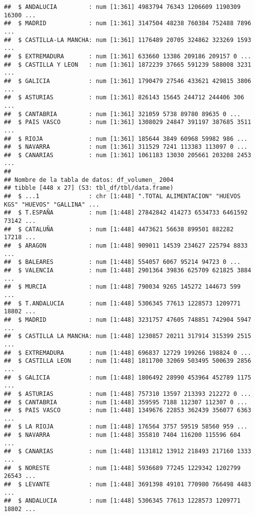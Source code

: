 \documentclass[
]{article}
\begin{document}
\begin{verbatim}
##  $ ANDALUCIA         : num [1:361] 4983794 76343 1206609 1190309 16300 ...
##  $ MADRID            : num [1:361] 3147504 48238 760384 752488 7896 ...
##  $ CASTILLA-LA MANCHA: num [1:361] 1176489 20705 324862 323269 1593 ...
##  $ EXTREMADURA       : num [1:361] 633660 13386 209186 209157 0 ...
##  $ CASTILLA Y LEON   : num [1:361] 1872239 37665 591239 588008 3231 ...
##  $ GALICIA           : num [1:361] 1790479 27546 433621 429815 3806 ...
##  $ ASTURIAS          : num [1:361] 826143 15645 244712 244406 306 ...
##  $ CANTABRIA         : num [1:361] 321059 5738 89780 89635 0 ...
##  $ PAIS VASCO        : num [1:361] 1308029 24847 391197 387685 3511 ...
##  $ RIOJA             : num [1:361] 185644 3849 60968 59982 986 ...
##  $ NAVARRA           : num [1:361] 311529 7241 113383 113097 0 ...
##  $ CANARIAS          : num [1:361] 1061183 13030 205661 203208 2453 ...
##  
## Nombre de la tabla de datos: df_volumen_ 2004 
## tibble [448 x 27] (S3: tbl_df/tbl/data.frame)
##  $ ...1              : chr [1:448] ".TOTAL ALIMENTACION" "HUEVOS KGS" "HUEVOS" "GALLINA" ...
##  $ T.ESPAÑA          : num [1:448] 27842842 414273 6534733 6461592 73142 ...
##  $ CATALUÑA          : num [1:448] 4473621 56638 899501 882282 17218 ...
##  $ ARAGON            : num [1:448] 909011 14539 234627 225794 8833 ...
##  $ BALEARES          : num [1:448] 554057 6067 95214 94723 0 ...
##  $ VALENCIA          : num [1:448] 2901364 39836 625709 621825 3884 ...
##  $ MURCIA            : num [1:448] 790034 9265 145272 144673 599 ...
##  $ T.ANDALUCIA       : num [1:448] 5306345 77613 1228573 1209771 18802 ...
##  $ MADRID            : num [1:448] 3231757 47605 748851 742904 5947 ...
##  $ CASTILLA LA MANCHA: num [1:448] 1230857 20211 317914 315399 2515 ...
##  $ EXTREMADURA       : num [1:448] 696837 12729 199266 198824 0 ...
##  $ CASTILLA LEON     : num [1:448] 1811700 32069 503495 500639 2856 ...
##  $ GALICIA           : num [1:448] 1806492 28990 453964 452789 1175 ...
##  $ ASTURIAS          : num [1:448] 757310 13597 213393 212272 0 ...
##  $ CANTABRIA         : num [1:448] 359595 7188 112307 112307 0 ...
##  $ PAIS VASCO        : num [1:448] 1349676 22853 362439 356077 6363 ...
##  $ LA RIOJA          : num [1:448] 176564 3757 59519 58560 959 ...
##  $ NAVARRA           : num [1:448] 355810 7404 116200 115596 604 ...
##  $ CANARIAS          : num [1:448] 1131812 13912 218493 217160 1333 ...
##  $ NORESTE           : num [1:448] 5936689 77245 1229342 1202799 26543 ...
##  $ LEVANTE           : num [1:448] 3691398 49101 770980 766498 4483 ...
##  $ ANDALUCIA         : num [1:448] 5306345 77613 1228573 1209771 18802 ...

\end{verbatim}
\end{document}
